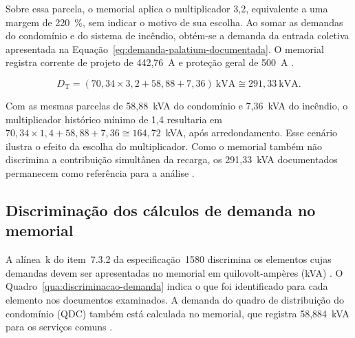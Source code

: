Sobre essa parcela, o memorial aplica o multiplicador 3,2, equivalente a uma margem de 220~\%, sem indicar o motivo de sua escolha. Ao somar as demandas do condomínio e do sistema de incêndio, obtém-se a demanda da entrada coletiva apresentada na Equação~\ref{eq:demanda-palatium-documentada}. O memorial registra corrente de projeto de 442,76~A e proteção geral de 500~A \cite[p.~7]{palatiummemorial2025}.

\begin{equation}
 D_{\mathrm{T}}=(70{,}34\times3{,}2+58{,}88+7{,}36)~\mathrm{kVA}
 \cong291{,}33~\mathrm{kVA}.
 \label{eq:demanda-palatium-documentada}
\end{equation}

Com as mesmas parcelas de 58,88~kVA do condomínio e 7,36~kVA do incêndio, o multiplicador histórico mínimo de 1,4 resultaria em \(70{,}34\times1{,}4+58{,}88+7{,}36\cong164{,}72\)~kVA, após arredondamento. Esse cenário ilustra o efeito da escolha do multiplicador. Como o memorial também não discrimina a contribuição simultânea da recarga, os 291,33~kVA documentados permanecem como referência para a análise \cite[p.~7 e~13]{palatiummemorial2025}.

\subsection{Discriminação dos cálculos de demanda no memorial}
\label{subsec:impacto-discriminacao-demanda}

A alínea~k do item~7.3.2 da especificação~1580 discrimina os elementos cujas demandas devem ser apresentadas no memorial em quilovolt-ampères (kVA) \cite[item~7.3.2, alínea~k, p.~21]{enel1580}. O Quadro~\ref{qua:discriminacao-demanda} indica o que foi identificado para cada elemento nos documentos examinados. A demanda do quadro de distribuição do condomínio (QDC) também está calculada no memorial, que registra 58,884~kVA para os serviços comuns \cite[p.~8--9]{palatiummemorial2025}.

